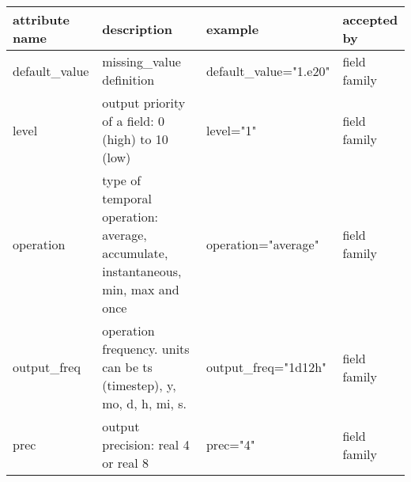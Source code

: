 \documentclass[../main/NEMO_manual]{subfiles}
\begin{document}
\begin{table}
  \scriptsize
  \begin{tabularx}{\textwidth}{|l|X|l|l|}
    \hline
    attribute name                                                                                       &
    description                                                                                          &
    example                                                                                              &
    accepted by                            \\
    \hline
    \hline
    default\_value                                                                                       &
    missing\_value definition                                                                            &
    default\_value="1.e20"                                                                               &
    field family                           \\
    \hline
    level                                                                                                &
    output priority of a field: 0 (high) to 10 (low)                                                     &
    level="1"                                                                                            &
    field family                           \\
    \hline
    operation                                                                                            &
    type of temporal operation: average, accumulate, instantaneous, min, max and once                    &
    operation="average"                                                                                  &
    field family                           \\
    \hline
    output\_freq                                                                                         &
    operation frequency. units can be ts (timestep), y, mo, d, h, mi, s.                                 &
    output\_freq="1d12h"                                                                                 &
    field family                           \\
    \hline
    prec                                                                                                 &
    output precision: real 4 or real 8                                                                   &
    prec="4"                                                                                             &
    field family                           \\

\end{tabularx}
\end{table}
\end{document}
